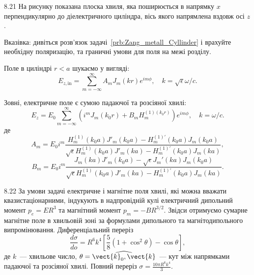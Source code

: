 \begin{Solution}{8.{21}}
На рисунку показана плоска хвиля, яка поширюється в напрямку $x$ перпендикулярно до діелектричного циліндра, вісь якого напрямлена вздовж осі $z$.

	\begin{center}
	\end{center}

	Вказівка: дивіться розв'язок задачі~\ref{prb:Zang_metall_Cyllinder} і врахуйте необхідну поляризацію, та граничні умови для поля на межі розділу.

	Поле в циліндрі $r < a$ шукаємо у вигляді:
	\[
		E_{z,\text{in}} = \sum\limits_{m = -\infty}^{\infty}A_mJ_m(kr)e^{im\phi}, \quad k=\sqrt{\epsilon} \omega/c.
	\]

	Зовні, електричне поле є сумою падаючої та розсіяної хвилі:
	\[
		E_z = E_0 \sum\limits_{m = -\infty}^{\infty} \left( i^m J_m(k_0 r) + B_m H_m^{(1)(k_0r)} \right) e^{im\phi}, \quad k= \omega/c.
	\]
	де
	\[
		A_m = E_0i^m \frac{  H_m^{(1)}(k_0a) J'_m(k_0a) - H_m^{(1)\prime}(k_0a) J_m(k_0a)    }{ \sqrt{\epsilon} H_m^{(1)}(k_0a) J'_m(ka) - H_m^{(1)\prime}(k_0a) J_m(ka)},
	\]
	\[
		B_m = E_0i^m \frac{  J_m(ka) J'_m(k_0a) - \sqrt{\epsilon} J_m'(ka) J_m(k_0a)    }{ \sqrt{\epsilon} H_m^{(1)}(k_0a) J'_m(ka) - H_m^{(1)\prime}(k_0a) J_m(ka)}.
	\]

\end{Solution}
\begin{Solution}{8.{22}}
    За умови задачі  електричне і магнітне поля хвилі, які можна вважати квазистаціонарними, індукують в надпровідній кулі електричний дипольний момент $p_e=ER^3$ та магнітний момент $p_m=-BR^{3/2}$. Звідси отримуємо сумарне магнітне поле в хвильовій зоні за формулами дипольного та магнітодипольного випромінювання.
	Диференціальний переріз
	\[
		\frac{d\sigma}{do} = R^6 k^4 \left[\frac58 (1 + \cos^2\theta) -\cos\theta\right],
	\]
	де $k$~--- хвильове число, $\theta = \widehat{\vect{k}_0,\vect{k}}$~--- кут між напрямками падаючої та розсіяної хвилі.
	Повний переріз $\sigma = \frac{10\pi R^6 k^4}{3}$.
\end{Solution}
